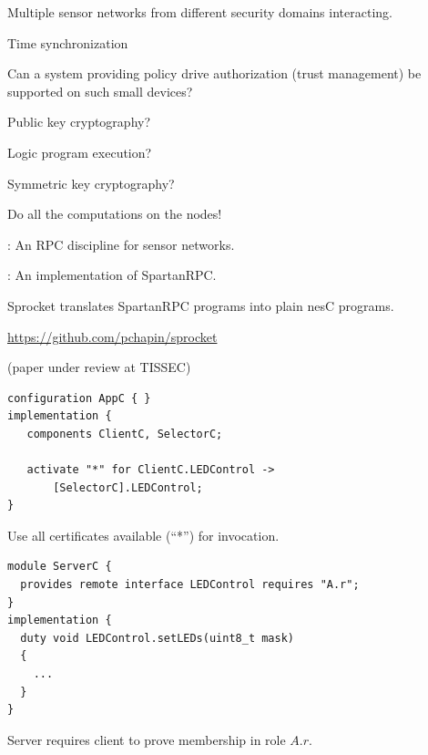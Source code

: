 
Multiple sensor networks from different security domains interacting.

 Time synchronization

Can a system providing policy drive authorization (trust management) be supported on such small
devices?
\begin{citemize}
\item Public key cryptography?
\item Logic program execution?
\item Symmetric key cryptography?
\end{citemize}
\stopslide



\begin{citemize}
\item Do all the computations on the nodes!
\item {}: An RPC discipline for sensor networks.
\item {}: An implementation of SpartanRPC.
\end{citemize}

Sprocket translates SpartanRPC programs into plain nesC programs.

\begin{center}
\url{https://github.com/pchapin/sprocket}
\end{center}

(paper under review at TISSEC)
\stopslide

\begin{lstlisting}[language=nesC]
configuration AppC { }
implementation {
   components ClientC, SelectorC;

   activate "*" for ClientC.LEDControl ->
       [SelectorC].LEDControl;
}
\end{lstlisting}

Use all certificates available (``*'') for invocation.
\stopslide

\begin{lstlisting}[language=nesC]
module ServerC {
  provides remote interface LEDControl requires "A.r";
}
implementation {
  duty void LEDControl.setLEDs(uint8_t mask)
  {
    ...
  }
}
\end{lstlisting}

Server requires client to prove membership in role $A.r$.
\stopslide

